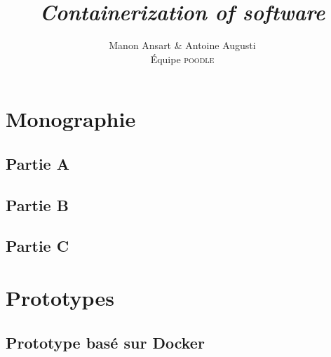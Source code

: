 \documentclass[a4paper, 12pt, french, titlepage]{scrreprt}
\title{\textit{Containerization of software}}
\author{Manon Ansart \& Antoine Augusti\\Équipe \textsc{poodle}}
\date{}
\begin{document}
    \maketitle

    \tableofcontents
    \chapter{Monographie}
        \section{Partie A}
            

        \section{Partie B}
            

        \section{Partie C}
            

    \chapter{Prototypes}
        \section{Prototype basé sur Docker}
            

    
    
\end{document}

